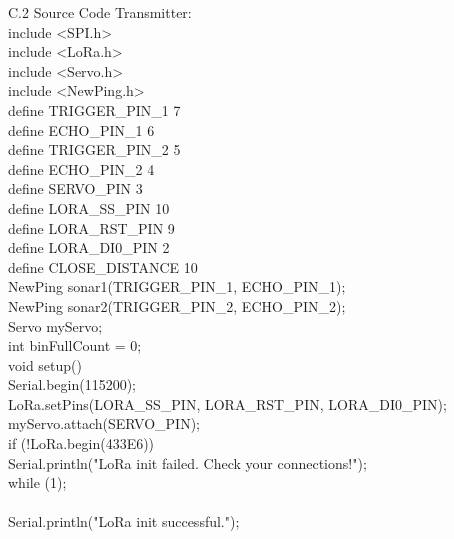 \documentclass[conference, onecolumn]{IEEEtran}
\begin{document}
C.2 Source Code Transmitter:\\
include <SPI.h>\\
include <LoRa.h>\\
include <Servo.h>\\
include <NewPing.h>\\

define TRIGGER_PIN_1 7\\
define ECHO_PIN_1 6\\
define TRIGGER_PIN_2 5\\
define ECHO_PIN_2 4\\
define SERVO_PIN 3\\
define LORA_SS_PIN 10\\
define LORA_RST_PIN 9\\
define LORA_DI0_PIN 2\\
define CLOSE_DISTANCE 10\\

NewPing sonar1(TRIGGER_PIN_1, ECHO_PIN_1);\\
NewPing sonar2(TRIGGER_PIN_2, ECHO_PIN_2);\\
Servo myServo;\\

int binFullCount = 0;\\

void setup() {\\
  Serial.begin(115200);\\

  LoRa.setPins(LORA_SS_PIN, LORA_RST_PIN, LORA_DI0_PIN);\\
  myServo.attach(SERVO_PIN);\\
  if (!LoRa.begin(433E6)) {\\
    Serial.println("LoRa init failed. Check your connections!");\\
    while (1);\\
  }\\
  Serial.println("LoRa init successful.");\\
}
\end{document}
